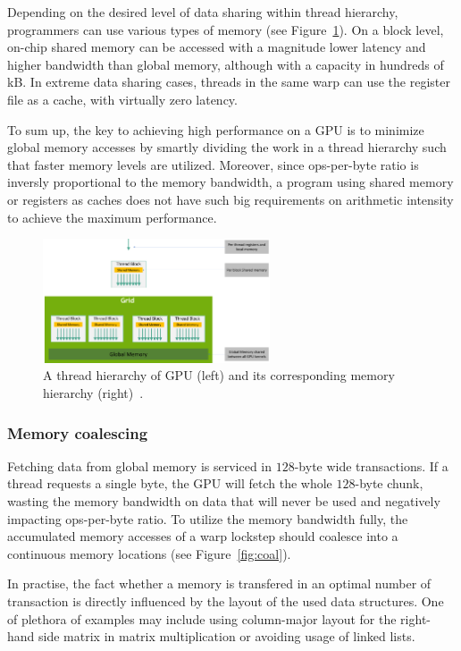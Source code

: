 Depending on the desired level of data sharing within thread hierarchy, programmers can use various types of memory (see Figure~\ref{fig:mem-hierarchy}). On a block level, on-chip shared memory can be accessed with a magnitude lower latency and higher bandwidth than global memory, although with a capacity in hundreds of kB. In extreme data sharing cases, threads in the same warp can use the register file as a cache, with virtually zero latency. 

To sum up, the key to achieving high performance on a GPU is to minimize global memory accesses by smartly dividing the work in a thread hierarchy such that faster memory levels are utilized. Moreover, since ops-per-byte ratio is inversly proportional to the memory bandwidth, a program using shared memory or registers as caches does not have such big requirements on arithmetic intensity to achieve the maximum performance.

\begin{figure}
    \centering
    \includegraphics[width=0.6\textwidth]{img/mem-hierarchy-2.png}
    \caption{A thread hierarchy of GPU (left) and its corresponding memory hierarchy (right)~\cite{site:cuda}.}
    \label{fig:mem-hierarchy}
\end{figure}

\subsubsection{Memory coalescing}
\label{sec:coalescing}

Fetching data from global memory is serviced in $128$-byte wide transactions. If a thread requests a single byte, the GPU will fetch the whole $128$-byte chunk, wasting the memory bandwidth on data that will never be used and negatively impacting ops-per-byte ratio. To utilize the memory bandwidth fully, the accumulated memory accesses of a warp lockstep should coalesce into a continuous memory locations (see Figure~\ref{fig:coal}).

In practise, the fact whether a memory is transfered in an optimal number of transaction is directly influenced by the layout of the used data structures. One of plethora of examples may include using column-major layout for the right-hand side matrix in matrix multiplication or avoiding usage of linked lists.

